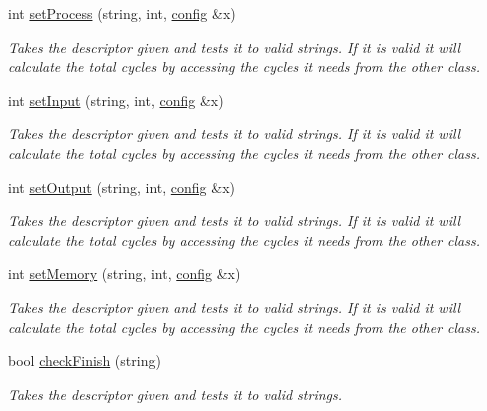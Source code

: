 \begin{DoxyCompactItemize}
int \mbox{\hyperlink{classmeta_ae2ae12882e80f96acc82e0c55dba8fe6}{set\+Process}} (string, int, \mbox{\hyperlink{classconfig}{config}} \&x)
\begin{DoxyCompactList}\small\item\em Takes the descriptor given and tests it to valid strings. If it is valid it will calculate the total cycles by accessing the cycles it needs from the other class. \end{DoxyCompactList}\item 
int \mbox{\hyperlink{classmeta_a64ab5feab351ac0611c9db92ac319e87}{set\+Input}} (string, int, \mbox{\hyperlink{classconfig}{config}} \&x)
\begin{DoxyCompactList}\small\item\em Takes the descriptor given and tests it to valid strings. If it is valid it will calculate the total cycles by accessing the cycles it needs from the other class. \end{DoxyCompactList}\item 
int \mbox{\hyperlink{classmeta_adf22457ef8edc4d8d9cf61f077593ae1}{set\+Output}} (string, int, \mbox{\hyperlink{classconfig}{config}} \&x)
\begin{DoxyCompactList}\small\item\em Takes the descriptor given and tests it to valid strings. If it is valid it will calculate the total cycles by accessing the cycles it needs from the other class. \end{DoxyCompactList}\item 
int \mbox{\hyperlink{classmeta_a7134e9c2093c85766728b2418dab6c36}{set\+Memory}} (string, int, \mbox{\hyperlink{classconfig}{config}} \&x)
\begin{DoxyCompactList}\small\item\em Takes the descriptor given and tests it to valid strings. If it is valid it will calculate the total cycles by accessing the cycles it needs from the other class. \end{DoxyCompactList}\item 
bool \mbox{\hyperlink{classmeta_a058e013c346255e0e29a6d8996a26d5d}{check\+Finish}} (string)
\begin{DoxyCompactList}\small\item\em Takes the descriptor given and tests it to valid strings. \end{DoxyCompactList}\item 
\mbox{\label{classmeta_ac2960b98bde11f9bbd438e81ebff9f4b}} 

\end{DoxyCompactItemize}
